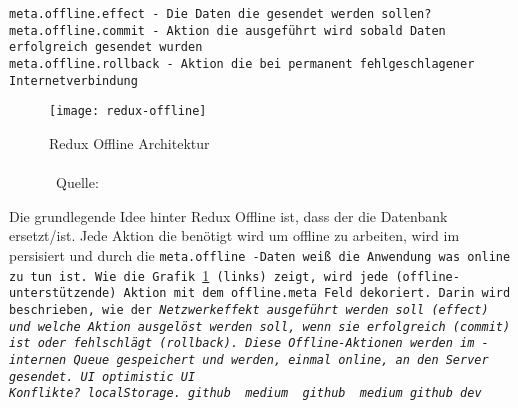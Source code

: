   \tt{meta.offline.effect} - Die Daten die gesendet werden sollen?\\
  \tt{meta.offline.commit} - Aktion die ausgeführt wird sobald Daten erfolgreich gesendet wurden\\
  \tt{meta.offline.rollback} - Aktion die bei permanent fehlgeschlagener Internetverbindung
  ~\cite{redux-offline-gh}
  \begin{figure}[H]
    \centering
    \texttt{[image: redux-offline]}
    \grayRule
    \caption[Redux Offline]{Redux Offline Architektur\\\\~Quelle:~\cite{redux-offline}}
     \label{fig:redux-offline}
\end{figure}
Die grundlegende Idee hinter Redux Offline ist, dass der  die Datenbank ersetzt/ist. Jede Aktion die benötigt wird um offline zu arbeiten, wird im  persisiert und durch die \tt{meta.offline} -Daten weiß die Anwendung was online zu tun ist. Wie die Grafik \ref{fig:redux-offline} (links) zeigt, wird jede (offline-unterstützende) Aktion mit dem \tt{offline.meta} Feld dekoriert. Darin wird beschrieben, wie der \it{Netzwerkeffekt} ausgeführt werden soll (\tt{effect}) und welche Aktion ausgelöst werden soll, wenn sie erfolgreich (\tt{commit}) ist oder fehlschlägt (\tt{rollback}). Diese Offline-Aktionen werden im -internen \gls{Queue} gespeichert und werden, einmal online, an den Server gesendet. \gls{UI} \gls{optimistic UI}\\

{\LARGE Konflikte?}
  localStorage. github~\cite{redux-persist-gh} medium~\cite{redux-persist}
  github \cite{rn-offline-gh} medium\cite{rn-offline-medium}
  github\cite{webpack-gh}
  dev\cite{webpack-dev}
  \cite{hoodie}